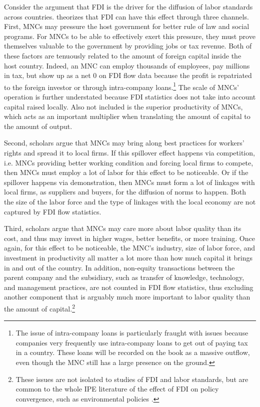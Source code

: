 Consider the argument that FDI is the driver for the diffusion of labor
standards across countries. \citet{Mosley2007} theorizes that FDI can have this
effect through three channels. First, MNCs may pressure the host government for
better rule of law and social programs. For MNCs to be able to effectively exert
this pressure, they must prove themselves valuable to the government by
providing jobs or tax revenue. Both of these factors are tenuously related to
the amount of foreign capital inside the host country. Indeed, an MNC can employ
thousands of employees, pay millions in tax, but show up as a net 0 on FDI flow
data because the profit is repatriated to the foreign investor or through
intra-company loans.\footnote{The issue of intra-company loans is particularly
  fraught with issues because companies very frequently use intra-company loans
  to get out of paying tax in a country. These loans will be recorded on the
  book as a massive outflow, even though the MNC still has a large presence on
  the ground.} The scale of MNCs' operation is further understated because FDI
statistics does not take into account capital raised locally. Also not included
is the superior productivity of MNCs, which acts as an important multiplier when
translating the amount of capital to the amount of output.

Second, scholars argue that MNCs may bring along best practices for workers'
rights and spread it to local firms. If this spillover effect happens via
competition, i.e. MNCs providing better working condition and forcing local
firms to compete, then MNCs must employ a lot of labor for this effect to be
noticeable. Or if the spillover happens via demonstration, then MNCs must form a
lot of linkages with local firms, as suppliers and buyers, for the diffusion of
norms to happen. Both the size of the labor force and the type of linkages with
the local economy are not captured by FDI flow statistics.

Third, scholars argue that MNCs may care more about labor quality than its cost,
and thus may invest in higher wages, better benefits, or more training. Once
again, for this effect to be noticeable, the MNC's industry, size of labor
force, and investment in productivity all matter a lot more than how much
capital it brings in and out of the country. In addition, non-equity
transactions between the parent company and the subsidiary, such as transfer of
knowledge, technology, and management practices, are not counted in FDI flow
statistics, thus excluding another component that is arguably much more
important to labor quality than the amount of capital.\footnote{These issues are
  not isolated to studies of FDI and labor standards, but are common to the
  whole IPE literature of the effect of FDI on policy convergence, such as
  environmental policies \citep{Prakash2007}.}

